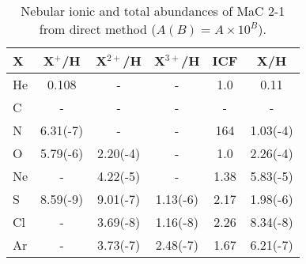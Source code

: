 \documentclass[a4paper,fleqn,usenatbib]{mnras}
\begin{document}
\begin{table}
\centering
\small
\caption{Nebular ionic and total abundances of MaC 2-1 from direct method ($A(B)=A\times10^B$). \label{tab:abunmac2-1}}
\begin{tabular}{l c c c c c}
\hline
X & X$^{+}$/H & X$^{2+}$/H & X$^{3+}$/H & ICF & X/H\\
\hline
He	&	0.108	&	-	 	&	-		& 1.0 	& 0.11\\
C	&	-		&	-		&	-	    & - 		& - \\
N	&	6.31(-7)	&	-		&	-		& 164 	& 1.03(-4)\\
O	&	5.79(-6)	&	2.20(-4)	&	-		& 1.0 	& 2.26(-4)\\
Ne	&	-		&	4.22(-5)	&	-		& 1.38 	& 5.83(-5)\\
S	&	8.59(-9)	&	9.01(-7)&	1.13(-6)	& 2.17 		& 1.98(-6)\\
Cl	&	-		&	3.69(-8)	&	1.16(-8)	& 2.26 		& 8.34(-8)\\
Ar	&	-		&	3.73(-7)&	2.48(-7)	& 1.67 	& 6.21(-7)\\
\hline
\end{tabular}
\end{table}
\end{document}
